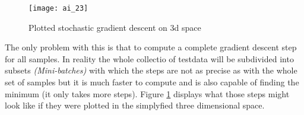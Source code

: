 \documentclass{article}
\begin{document}
\begin{figure}[!htbp]
	\centering
	\texttt{[image: ai\_23]}
	\caption{Plotted stochastic gradient descent on 3d space}
	\label{ai_23}
\end{figure}

The only problem with this is that to compute a complete gradient descent step for all samples. In reality the whole collectio of testdata will be subdivided into subsets \textit{(Mini-batches)} with which the steps are not as precise as with the whole set of samples but it is much faster to compute and is also capable of finding the minimum (it only takes more steps). Figure \ref{ai_23} displays what those steps might look like if they were plotted in the simplyfied three dimensional space.
\end{document}
